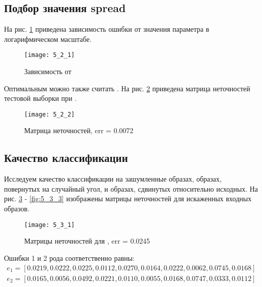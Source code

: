 \subsection{Подбор значения spread}


На рис. \ref{fig:5_2_1} приведена зависимость ошибки  от значения параметра  в логарифмическом масштабе. 
\begin{figure}[H]
\begin{center}
	\texttt{[image: 5\_2\_1]}
	\caption{Зависимость  от }
	\label{fig:5_2_1}
\end{center}
\end{figure}
\vspace{-1cm}

Оптимальным можно также считать . На рис. \ref{fig:5_2_2} приведена матрица неточностей тестовой выборки при .
\begin{figure}[H]
\begin{center}
	\texttt{[image: 5\_2\_2]}
	\caption{Матрица неточностей, err = 0.0072}
	\label{fig:5_2_2}
\end{center}
\end{figure}

\subsection{Качество классификации}


Исследуем качество классификации на зашумленные образах, образах, повернутых на случайный угол, и образах, сдвинутых относительно исходных. На рис. \ref{fig:5_3_1} - \ref{fig:5_3_3} изображены матрицы неточностей для искаженных входных образов.
\begin{figure}[H]
\begin{center}
	\texttt{[image: 5\_3\_1]}
	\caption{Матрицы неточностей для , err = 0.0245}
	\label{fig:5_3_1}
\end{center}
\end{figure}
Ошибки 1 и 2 рода соответственно равны:
\begin{gather*}
e_1 = [0.0219, 0.0222, 0.0225, 0.0112, 0.0270, 0.0164, 0.0222, 0.0062, 0.0745, 0.0168]\\
e_2 = [0.0165, 0.0056, 0.0492, 0.0221, 0.0110, 0.0055, 0.0168, 0.0747, 0.0333, 0.0112]
\end{gather*}

